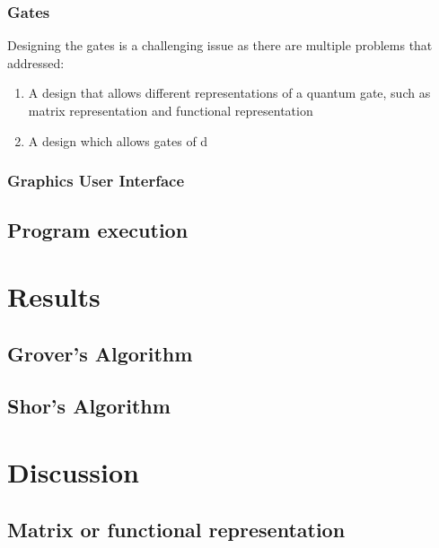 \documentclass[bibliography=totocnumbered]{article}
\theoremstyle{NoticeStyle}
\begin{document}
\subsubsection{Gates}
Designing the gates is a challenging issue as there are multiple problems that addressed:
\begin{enumerate}
	\item A design that allows different representations of a quantum gate, such as matrix representation and functional representation
	\item A design which allows gates of d
\end{enumerate}

\subsubsection{Graphics User Interface}

\subsection{Program execution}


%
\section{Results}

\subsection{Grover's Algorithm}

\subsection{Shor's Algorithm}


%
\section{Discussion}

\subsection{Matrix or functional representation}
\end{document}
